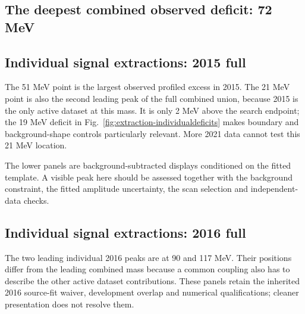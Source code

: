 \clearpage
\begin{landscape}
\subsection*{The deepest combined observed deficit: 72 MeV}

\end{landscape}

\clearpage
\subsection*{Individual signal extractions: 2015 full}
The 51 MeV point is the largest observed profiled excess in 2015. The 21 MeV point is also the second leading peak of the full combined union, because 2015 is the only active dataset at this mass. It is only 2 MeV above the search endpoint; the 19 MeV deficit in Fig.~\ref{fig:extraction-individualdeficits} makes boundary and background-shape controls particularly relevant. More 2021 data cannot test this 21 MeV location.


The lower panels are background-subtracted displays conditioned on the fitted template. A visible peak here should be assessed together with the background constraint, the fitted amplitude uncertainty, the scan selection and independent-data checks.

\clearpage
\subsection*{Individual signal extractions: 2016 full}
The two leading individual 2016 peaks are at 90 and 117 MeV. Their positions differ from the leading combined mass because a common coupling also has to describe the other active dataset contributions. These panels retain the inherited 2016 source-fit waiver, development overlap and numerical qualifications; cleaner presentation does not resolve them.

